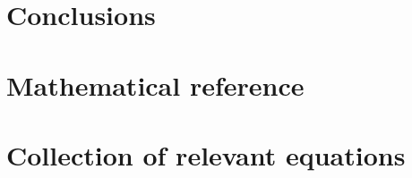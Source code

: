 \documentclass[a4paper, 12pt]{book}
\begin{document}
\chapter{Conclusions}


\clearpage

\begin{appendices}
\pagestyle{append}

\chapter{Mathematical reference}


\chapter{Collection of relevant equations}


\clearpage
\end{appendices}

\pagestyle{biblio}
\printbibliography[heading = bibintoc, title = {Bibliography}]
\end{document}
